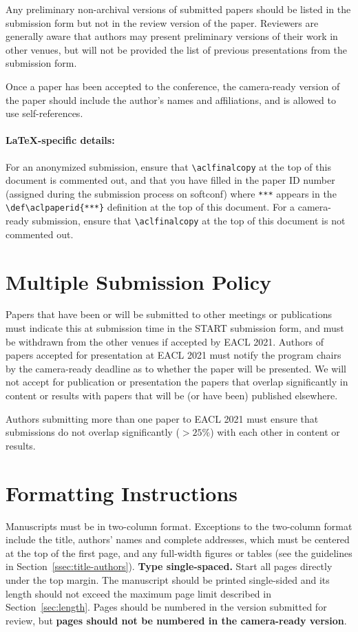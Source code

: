 \documentclass[11pt,a4paper]{article}
\begin{document}
Any preliminary non-archival versions of submitted papers should be listed in the submission form but not in the review version of the paper.
Reviewers are generally aware that authors may present preliminary versions of their work in other venues, but will not be provided the list of previous presentations from the submission form.

Once a paper has been accepted to the conference, the camera-ready version of the paper should include the author's names and affiliations, and is allowed to use self-references.

\paragraph{\LaTeX-specific details:}
For an anonymized submission, ensure that {\small\verb|\aclfinalcopy|} at the top of this document is commented out, and that you have filled in the paper ID number (assigned during the submission process on softconf) where {\small\verb|***|} appears in the {\small\verb|\def\aclpaperid{***}|} definition at the top of this document.
For a camera-ready submission, ensure that {\small\verb|\aclfinalcopy|} at the top of this document is not commented out.


\section{Multiple Submission Policy}
Papers that have been or will be submitted to other meetings or publications must indicate this at submission time in the START submission form, and must be withdrawn from the other venues if accepted by EACL 2021. Authors of papers accepted for presentation at EACL 2021 must notify the program chairs by the camera-ready deadline as to whether the paper will be presented. We will not accept for publication or presentation the papers that overlap significantly in content or results with papers that will be (or have been) published elsewhere.

Authors submitting more than one paper to EACL 2021 must ensure that submissions do not overlap significantly ($>25\%$) with each other in content or results.



\section{Formatting Instructions}

Manuscripts must be in two-column format.
Exceptions to the two-column format include the title, authors' names and complete addresses, which must be centered at the top of the first page, and any full-width figures or tables (see the guidelines in Section~\ref{ssec:title-authors}).
\textbf{Type single-spaced.}
Start all pages directly under the top margin.
The manuscript should be printed single-sided and its length should not exceed the maximum page limit described in Section~\ref{sec:length}.
Pages should be numbered in the version submitted for review, but \textbf{pages should not be numbered in the camera-ready version}.
\end{document}
